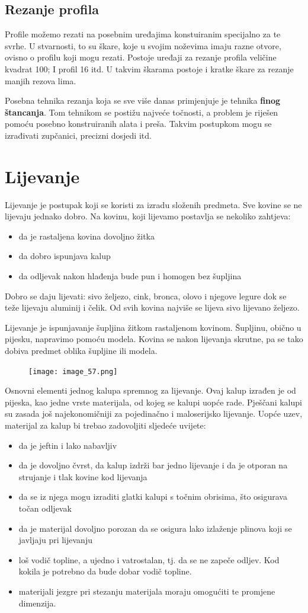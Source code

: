 \documentclass[a4paper,12pt]{article}
\numberwithin{figure}{section}
\begin{document}
\subsection{Rezanje profila}
Profile možemo rezati na posebnim uređajima konstuiranim specijalno za te svrhe. U stvarnosti, to su škare, koje u svojim noževima imaju razne otvore, ovisno o profilu koji mogu rezati. Postoje uređaji za rezanje profila veličine kvadrat 100; I profil 16 itd. U takvim škarama postoje i kratke škare za rezanje manjih rezova lima.\par
Posebna tehnika rezanja koja se sve više danas primjenjuje je tehnika \textbf{finog štancanja}. Tom tehnikom se postižu najveće točnosti, a problem je riješen pomoću posebno konstruiranih alata i preša. Takvim postupkom mogu se izrađivati zupčanici, precizni dosjedi itd.
\section{Lijevanje}
Lijevanje je postupak koji se koristi za izradu složenih predmeta. Sve kovine se ne lijevaju jednako dobro. Na kovinu, koji lijevamo postavlja se nekoliko zahtjeva:
\begin{itemize}
\item da je rastaljena kovina dovoljno žitka
\item da dobro ispunjava kalup
\item da odljevak nakon hlađenja bude pun i homogen bez šupljina
\end{itemize}
Dobro se daju lijevati: sivo željezo, cink, bronca, olovo i njegove legure dok se teže lijevaju aluminij i čelik. Od svih kovina najviše se lijeva sivo lijevano željezo. \par
Lijevanje je ispunjavanje šupljina žitkom rastaljenom kovinom. Šupljinu, obično u pijesku, napravimo pomoću modela. Kovina se nakon lijevanja skrutne, pa se tako dobiva predmet oblika šupljine ili modela.
\begin{figure}[!h]
\centering
\texttt{[image: image\_57.png]}
\end{figure}
\FloatBarrier
Osnovni elementi jednog kalupa spremnog za lijevanje. Ovaj kalup izrađen je od pijeska, kao jedne vrste materijala, od kojeg se kalupi uopće rade. Pješčani kalupi su zasada još najekonomičniji za pojedinačno i maloserijsko lijevanje. Uopće uzev, materijal za kalup bi trebao zadovoljiti sljedeće uvijete:
\begin{itemize}
\item da je jeftin i lako nabavljiv
\item da je dovoljno čvrst, da kalup izdrži bar jedno lijevanje i da je otporan na strujanje i tlak kovine kod lijevanja
\item da se iz njega mogu izraditi glatki kalupi s točnim obrisima, što osigurava točan odljevak
\item da je materijal dovoljno porozan da se osigura lako izlaženje plinova koji se javljaju pri lijevanju
\item loš vodič topline, a ujedno i vatrostalan, tj. da se ne zapeče odljev. Kod kokila je potrebno da bude dobar vodič topline.
\item materijali jezgre pri stezanju materijala moraju omogućiti te promjene dimenzija. 
\end{itemize}
\end{document}
